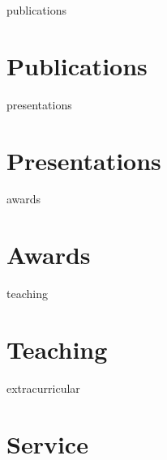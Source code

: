 \documentclass[12pt]{report} %
\begin{document}
\ifcsname publications\endcsname%
\section{Publications}
\publications{}
\fi



\ifcsname presentations\endcsname%
\section{Presentations}
\presentations{}
\fi



\ifcsname awards\endcsname%
\section{Awards}
\awards{}
\fi



\ifcsname teaching\endcsname%
\section{Teaching}
\teaching{}
\fi



\ifcsname extracurricular\endcsname%
\section{Service}
\extracurricular{}
\fi



\iffalse
\ifcsname grants\endcsname%
\section{Grant Writing}
\grants{}
\fi
\fi
\end{document}
